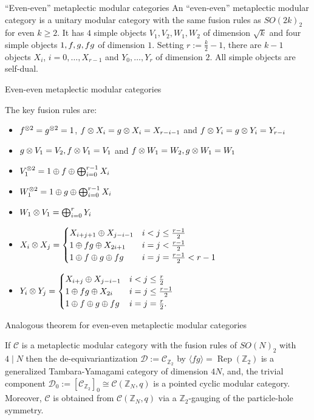 \documentclass{beamer}
\DeclareMathOperator{\Rep}{Rep}
\begin{document}
{\begin{frame}{``Even-even'' metaplectic modular categories}
  An ``even-even'' metaplectic modular category is a unitary modular category with the same fusion rules as $SO(2k)_2$ for even $k \ge 2$. It has $4$ simple objects $V_1, V_2, W_1, W_2$ of dimension $\sqrt{k}$ and four simple objects $1, f, g, fg$ of dimension $1$. Setting $r := \frac{k}{2} -1$, there are $k-1$ objects $X_i$, $i=0,\ldots,X_{r-1}$ and $Y_0, \ldots, Y_r$ of dimension $2$.  All simple objects are self-dual.
\end{frame}

\begin{frame}{Even-even metaplectic modular categories}

  The key fusion rules are:
  \begin{itemize}
  \item $f^{\otimes 2}=g^{\otimes 2}=1$, $f\otimes X_i=g\otimes X_i=X_{r-i-1}$ and $f\otimes Y_i=g\otimes Y_i=Y_{r-i}$
  \item $g\otimes V_1=V_2, f\otimes V_1=V_1$ and $f\otimes W_1=W_2, g\otimes W_1=W_1$
  \item $V_1^{\otimes 2}=1\oplus f\oplus\bigoplus_{i=0}^{r-1} X_i$
  \item $W_1^{\otimes 2}=1\oplus g\oplus\bigoplus_{i=0}^{r-1} X_i$
  \item $W_1\otimes V_1=\bigoplus_{i=0}^r Y_i$
  \item $X_i\otimes X_j=\begin{cases} X_{i+j+1}\oplus X_{j-i-1} & i<j\leq\frac{r-1}{2}\\ 1\oplus fg\oplus X_{2i+1} & i=j<\frac{r-1}{2}\\ 1 \oplus f\oplus g\oplus fg & i=j=\frac{r-1}{2}<r-1\end{cases}$
  \item $Y_i\otimes Y_j=\begin{cases} X_{i+j}\oplus X_{j-i-1} & i<j\leq\frac{r}{2}\\ 1\oplus fg\oplus X_{2i} & i=j\leq\frac{r-1}{2}\\ 1\oplus f\oplus g\oplus fg &i=j=\frac{r}{2}.\end{cases}$
 
  \end{itemize}

\end{frame}

\newcommand{\mcC}{\mathcal{C}}
\newcommand{\mcD}{\mathcal{D}}
\newcommand{\mbbZ}{\mathbb{Z}}


\begin{frame}{Analogous theorem for even-even metaplectic modular categories}
  \begin{theorem}
     If $\mcC$ is a metaplectic modular category with the fusion rules of $SO(N)_2$ with $4\mid N$ then the de-equivariantization $\mcD:=\mcC_{\mbbZ_2}$ by $\langle fg\rangle=\Rep(\mbbZ_2)$ is a  generalized
    Tambara-Yamagami category of dimension $4N$, and, the trivial
    component $\mcD_0:=[\mcC_{\mbbZ_2}]_0\cong\mcC(\mbbZ_N,q)$ is a pointed cyclic modular category.  Moreover, $\mcC$ is obtained from $\mcC(\mbbZ_N,q)$ via a $\mbbZ_2$-gauging of the particle-hole symmetry.
  \end{theorem}


\end{frame}}
\end{document}
